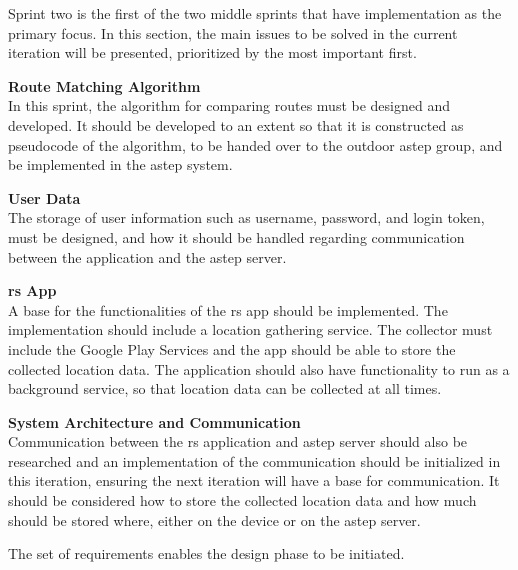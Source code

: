 Sprint two is the first of the two middle sprints that have implementation as the primary focus. In this section, the main issues to be solved in the current iteration will be presented, prioritized by the most important first.

\textbf{Route Matching Algorithm}\\
In this sprint, the algorithm for comparing routes must be designed and developed. 
It should be developed to an extent so that it is constructed as pseudocode of the algorithm, to be handed over to the outdoor \gls{astep} group, and be implemented in the \gls{astep} system.

\textbf{User Data}\\
The storage of user information such as username, password, and login token, must be designed, and how it should be handled regarding communication between the application and the \gls{astep} server.

\textbf{\gls{rs} App}\\
A base for the functionalities of the \gls{rs} app should be implemented. 
The implementation should include a location gathering service.
The collector must include the Google Play Services and the app should be able to store the collected location data. 
The application should also have functionality to run as a background service, so that location data can be collected at all times.

\textbf{System Architecture and Communication}\\
Communication between the \gls{rs} application and \gls{astep} server should also be researched and an implementation of the communication should be initialized in this iteration, ensuring the next iteration will have a base for communication. 
It should be considered how to store the collected location data and how much should be stored where, either on the device or on the \gls{astep} server.


The set of requirements enables the design phase to be initiated.